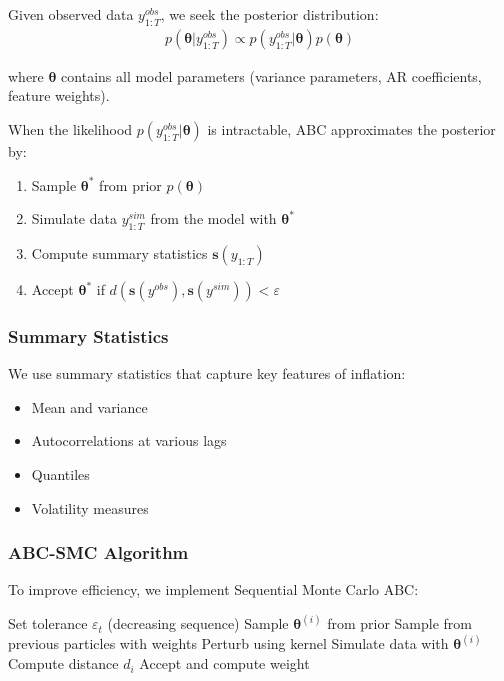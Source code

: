 Given observed data $y_{1:T}^{obs}$, we seek the posterior distribution:
\begin{align}
    p(\boldsymbol{\theta} | y_{1:T}^{obs}) \propto p(y_{1:T}^{obs} | \boldsymbol{\theta}) p(\boldsymbol{\theta})
\end{align}

where $\boldsymbol{\theta}$ contains all model parameters (variance parameters, AR coefficients, feature weights).

When the likelihood $p(y_{1:T}^{obs} | \boldsymbol{\theta})$ is intractable, ABC approximates the posterior by:

\begin{enumerate}
    \item Sample $\boldsymbol{\theta}^*$ from prior $p(\boldsymbol{\theta})$
    \item Simulate data $y_{1:T}^{sim}$ from the model with $\boldsymbol{\theta}^*$
    \item Compute summary statistics $\mathbf{s}(y_{1:T})$
    \item Accept $\boldsymbol{\theta}^*$ if $d(\mathbf{s}(y^{obs}), \mathbf{s}(y^{sim})) < \varepsilon$
\end{enumerate}

\subsubsection{Summary Statistics}

We use summary statistics that capture key features of inflation:
\begin{itemize}
    \item Mean and variance
    \item Autocorrelations at various lags
    \item Quantiles
    \item Volatility measures
\end{itemize}

\subsubsection{ABC-SMC Algorithm}

To improve efficiency, we implement Sequential Monte Carlo ABC:

\begin{algorithm}[H]
    \caption{ABC-SMC for State-Space Models}
    \begin{algorithmic}
            \STATE Set tolerance $\varepsilon_t$ (decreasing sequence)
                    \STATE Sample $\boldsymbol{\theta}^{(i)}$ from prior
                \ELSE
                    \STATE Sample from previous particles with weights
                    \STATE Perturb using kernel
                \ENDIF
                \STATE Simulate data with $\boldsymbol{\theta}^{(i)}$
                \STATE Compute distance $d_i$
                    \STATE Accept and compute weight
                \ENDIF
            \ENDFOR
        \ENDFOR
    \end{algorithmic}
\end{algorithm}

